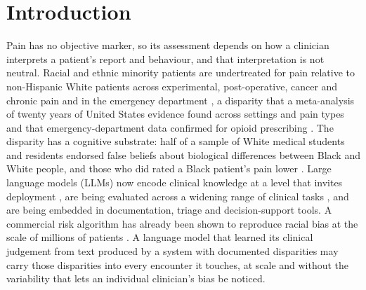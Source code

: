 \section{Introduction}
\label{sec:intro}

Pain has no objective marker, so its assessment depends on how a clinician
interprets a patient's report and behaviour, and that interpretation is not
neutral. Racial and ethnic minority patients are undertreated for pain relative
to non-Hispanic White patients across experimental, post-operative, cancer and
chronic pain and in the emergency department \cite{green2003unequal,
anderson2009racial}, a disparity that a meta-analysis of twenty years of United
States evidence found across settings and pain types \cite{meghani2012time} and
that emergency-department data confirmed for opioid prescribing
\cite{pletcher2008trends}. The disparity has a cognitive substrate: half of a
sample of White medical students and residents endorsed false beliefs about
biological differences between Black and White people, and those who did rated a
Black patient's pain lower \cite{hoffman2016racial}. Large language models
(LLMs) now encode clinical knowledge at a level that invites deployment
\cite{singhal2023large, thirunavukarasu2023large}, are being evaluated across a
widening range of clinical tasks \cite{bedi2025testing}, and are being embedded
in documentation, triage and decision-support tools. A commercial risk algorithm
has already been shown to reproduce racial bias at the scale of millions of
patients \cite{obermeyer2019dissecting}. A language model that learned its
clinical judgement from text produced by a system with documented disparities
may carry those disparities into every encounter it touches, at scale and
without the variability that lets an individual clinician's bias be noticed.

